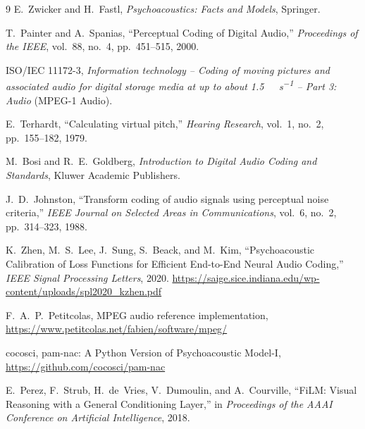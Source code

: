 \documentclass[11pt,a4paper]{article}
\begin{document}
\begin{thebibliography}{9}
  E.~Zwicker and H.~Fastl,
  \emph{Psychoacoustics: Facts and Models},
  Springer.

  T.~Painter and A.~Spanias,
  ``Perceptual Coding of Digital Audio,''
  \emph{Proceedings of the IEEE}, vol.~88, no.~4, pp.~451--515, 2000.

  ISO/IEC 11172-3,
  \emph{Information technology -- Coding of moving pictures and associated audio
  for digital storage media at up to about \SI{1.5}{\mega\bit\per\second} --
  Part 3: Audio} (MPEG-1 Audio).

  E.~Terhardt,
  ``Calculating virtual pitch,''
  \emph{Hearing Research}, vol.~1, no.~2, pp.~155--182, 1979.

  M.~Bosi and R.~E.~Goldberg,
  \emph{Introduction to Digital Audio Coding and Standards},
  Kluwer Academic Publishers.

  J.~D.~Johnston,
  ``Transform coding of audio signals using perceptual noise criteria,''
  \emph{IEEE Journal on Selected Areas in Communications},
  vol.~6, no.~2, pp.~314--323, 1988.

  K.~Zhen, M.~S.~Lee, J.~Sung, S.~Beack, and M.~Kim,
  ``Psychoacoustic Calibration of Loss Functions for Efficient End-to-End
  Neural Audio Coding,''
  \emph{IEEE Signal Processing Letters}, 2020.
  \url{https://saige.sice.indiana.edu/wp-content/uploads/spl2020_kzhen.pdf}

  F.~A.~P.~Petitcolas,
  MPEG audio reference implementation,
  \url{https://www.petitcolas.net/fabien/software/mpeg/}

  cocosci,
  pam-nac: A Python Version of Psychoacoustic Model-I,
  \url{https://github.com/cocosci/pam-nac}

  E.~Perez, F.~Strub, H.~de~Vries, V.~Dumoulin, and A.~Courville,
  ``FiLM: Visual Reasoning with a General Conditioning Layer,''
  in \emph{Proceedings of the AAAI Conference on Artificial Intelligence}, 2018.
\end{thebibliography}
\end{document}
